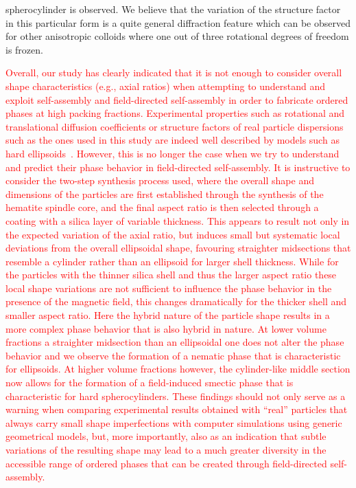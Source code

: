 \documentclass[aps,prl,preprint,superscriptaddress]{revtex4-1} %
\begin{document}
spherocylinder is observed. We believe that the variation of the structure factor in this particular form is a quite
general diffraction feature which can be observed for other anisotropic colloids where one out of three rotational
degrees of freedom is frozen.\par 
\textcolor{red}{Overall, our study has clearly indicated that it is not enough to consider overall shape characteristics
  (e.g., axial ratios) when attempting to understand and exploit self-assembly and field-directed self-assembly in order
  to fabricate ordered phases at high packing fractions. Experimental properties such as rotational and translational
  diffusion coefficients or structure factors of real particle dispersions such as the ones used in this study are
  indeed well described by models such as hard
  ellipsoids~\cite{martchenko2011,martchenko2016anisotropic,reufer2010morphology, reufer2012differential}. However, this
  is no longer the case when we try to understand and predict their phase behavior in field-directed self-assembly. It
  is instructive to consider the two-step synthesis process used, where the overall shape and dimensions of the
  particles are first established through the synthesis of the hematite spindle core, and the final aspect ratio is then
  selected through a coating with a silica layer of variable thickness. This appears to result not only in the expected
  variation of the axial ratio, but induces small but systematic local deviations from the overall ellipsoidal shape,
  favouring straighter {\color{green}midsections} that resemble a cylinder rather than an ellipsoid for larger shell thickness. While for
  the particles with the thinner silica shell and thus the larger aspect ratio these local shape variations are not
  sufficient to influence the phase behavior in the presence of the magnetic field, this changes dramatically for the
  thicker shell and smaller aspect ratio. Here the hybrid nature of the particle shape results in a more complex phase
  behavior that is also hybrid in nature. {\color{green}At lower volume fractions 
  a straighter midsection than an ellipsoidal one does not alter the phase behavior}   
  and we observe the formation of a nematic phase that is characteristic for ellipsoids. At higher volume
  fractions however, the cylinder-like middle section now allows for the formation of a field-induced smectic phase that
  is characteristic for hard spherocylinders. These findings should not only serve as a warning when comparing
  experimental results obtained with ``real'' particles that always carry small shape imperfections with computer
  simulations using generic geometrical models, but{\color{green}, more importantly, } also as an indication that subtle variations of the resulting shape
  may lead to a much greater diversity in the accessible range of ordered phases that can be created through
field-directed self-assembly.}\par
\end{document}
